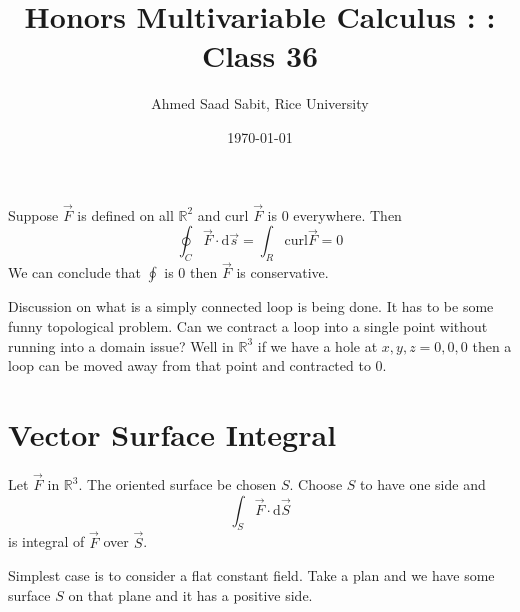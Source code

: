 \documentclass[letter]{article}
\title{Honors Multivariable Calculus : : Class 36}
\author{Ahmed Saad Sabit, Rice University}
\date{\today}
\begin{document}
\maketitle

Suppose $\vec{F}$ is defined on all $\mathbb{R}^{2}$ and curl $\vec{F}$ is $0$ everywhere. Then 
\[
\oint _C \vec{F} \cdot \mathrm{d} \vec{s} = \int_{R}^{} \text{curl} \vec{F} = 0 
\]
We can conclude that $\oint$ is 0 then $\vec{F}$ is conservative.


Discussion on what is a simply connected loop is being done. It has to be some funny topological problem. Can we contract a loop into a single point without running into a domain issue? Well in $\mathbb{R}^{3}$ if we have a hole at $x,y,z=0,0,0$ then a loop can be moved away from that point and contracted to 0.


\section*{Vector Surface Integral}
Let $\vec{F}$ in $\mathbb{R}^{3}$. The oriented surface be chosen $S$. Choose $S$ to have one side and 
\[
\int_S \vec{F} \cdot \mathrm{d} \vec{S}
\] 
is integral of $\vec{F}$ over $\vec{S}$. 

Simplest case is to consider a flat constant field. Take a plan and we have some surface $S$ on that plane and it has a positive side. 
\end{document}
